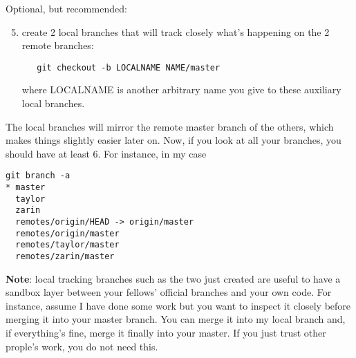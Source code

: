 \documentclass[12pt,a4paper,notitlepage,onecolumn]{article}
\begin{document}
Optional, but recommended:
\begin{enumerate}
 \setcounter{enumi}{4}
 \item create 2 local branches that will track closely what's happening on the 2 remote branches:
  \begin{verbatim}
   git checkout -b LOCALNAME NAME/master
  \end{verbatim}
  where LOCALNAME is another arbitrary name you give to these auxiliary local branches.
\end{enumerate}
The local branches will mirror the remote master branch of the others, which makes things slightly easier later on. Now, if you look at all your branches, you should have at least 6. For instance, in my case
\begin{verbatim}
git branch -a
* master
  taylor
  zarin
  remotes/origin/HEAD -> origin/master
  remotes/origin/master
  remotes/taylor/master
  remotes/zarin/master
\end{verbatim}

\noindent
{\bf Note}: local tracking branches such as the two just created are useful to have a sandbox layer between your fellows' official branches and your own code. For instance, assume I have done some work but you want to inspect it closely before merging it into your master branch. You can merge it into my local branch and, if everything's fine, merge it finally into your master. If you just trust other prople's work, you do not need this.
\end{document}
